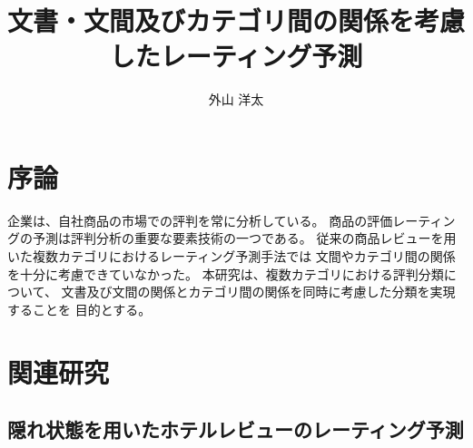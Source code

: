 \documentclass{ttisummary}
\title{文書・文間及びカテゴリ間の関係を考慮したレーティング予測}
\author{外山 洋太}
\begin{document}
\section{序論}




企業は、自社商品の市場での評判を常に分析している。
商品の評価レーティングの予測は評判分析の重要な要素技術の一つである。
従来の商品レビューを用いた複数カテゴリにおけるレーティング予測手法では
文間やカテゴリ間の関係を十分に考慮できていなかった。
本研究は、複数カテゴリにおける評判分類について、
文書及び文間の関係とカテゴリ間の関係を同時に考慮した分類を実現することを
目的とする。



\section{関連研究}

\subsection{隠れ状態を用いたホテルレビューのレーティング予測}
\end{document}
